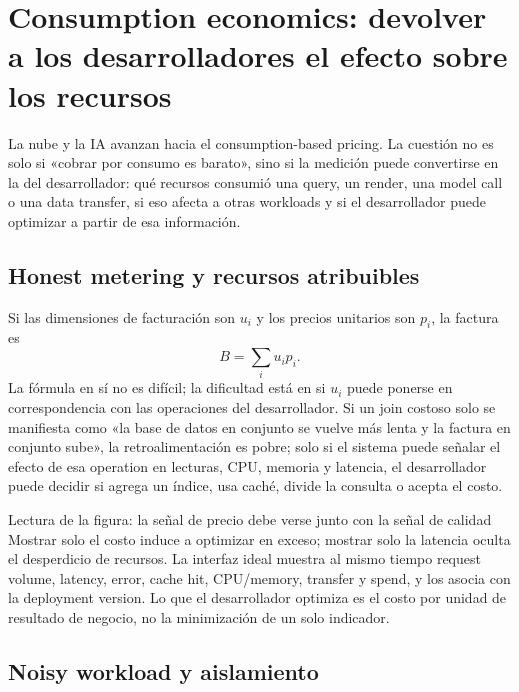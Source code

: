 \section{Consumption economics: devolver a los desarrolladores el efecto sobre los recursos}

La nube y la IA avanzan hacia el consumption-based pricing. La cuestión no es solo si «cobrar por consumo es barato», sino si la medición puede convertirse en la  del desarrollador: qué recursos consumió una query, un render, una model call o una data transfer, si eso afecta a otras workloads y si el desarrollador puede optimizar a partir de esa información.

\subsection{Honest metering y recursos atribuibles}

Si las dimensiones de facturación son $u_i$ y los precios unitarios son $p_i$, la factura es
\[
B=\sum_i u_i p_i.
\]
La fórmula en sí no es difícil; la dificultad está en si $u_i$ puede ponerse en correspondencia con las operaciones del desarrollador. Si un join costoso solo se manifiesta como «la base de datos en conjunto se vuelve más lenta y la factura en conjunto sube», la retroalimentación es pobre; solo si el sistema puede señalar el efecto de esa operation en lecturas, CPU, memoria y latencia, el desarrollador puede decidir si agrega un índice, usa caché, divide la consulta o acepta el costo.


\begin{knowledgebox}{Lectura de la figura: la señal de precio debe verse junto con la señal de calidad}
Mostrar solo el costo induce a optimizar en exceso; mostrar solo la latencia oculta el desperdicio de recursos. La interfaz ideal muestra al mismo tiempo request volume, latency, error, cache hit, CPU/memory, transfer y spend, y los asocia con la deployment version. Lo que el desarrollador optimiza es el costo por unidad de resultado de negocio, no la minimización de un solo indicador.
\end{knowledgebox}

\subsection{Noisy workload y aislamiento}

